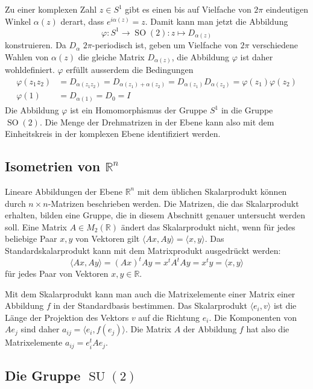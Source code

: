 Zu einer komplexen Zahl $z\in S^1$ gibt es einen bis auf Vielfache
von $2\pi$ eindeutigen Winkel $\alpha(z)$ derart, dass $e^{i\alpha(z)}=z$.
Damit kann man jetzt die Abbildung
\[
\varphi
\colon
S^1\to \operatorname{SO}(2)
:
z\mapsto  D_{\alpha(z)}
\]
konstruieren.
Da $D_{\alpha}$ $2\pi$-periodisch ist, geben um Vielfache
von $2\pi$ verschiedene Wahlen von $\alpha(z)$ die gleiche
Matrix $D_{\alpha(z)}$, die Abbildung $\varphi$ ist daher
wohldefiniert.
$\varphi$ erfüllt ausserdem die Bedingungen
\begin{align*}
\varphi(z_1z_2)
&=
D_{\alpha(z_1z_2)}
=
D_{\alpha(z_1)+\alpha(z_2)}
=
D_{\alpha(z_1)}D_{\alpha(z_2)}
=
\varphi(z_1)\varphi(z_2)
\\
\varphi(1)
&=
D_{\alpha(1)}
=
D_0
=
I
\end{align*}
Die Abbildung $\varphi$ ist ein Homomorphismus der Gruppe $S^1$
in die Gruppe $\operatorname{SO}(2)$.
Die Menge der Drehmatrizen in der Ebene kann also mit dem Einheitskreis
in der komplexen Ebene identifiziert werden.

\subsection{Isometrien von $\mathbb{R}^n$
\label{buch:gruppen:isometrien}}
Lineare Abbildungen der Ebene $\mathbb{R}^n$ mit dem üblichen Skalarprodukt
können durch $n\times n$-Matrizen beschrieben werden.
Die Matrizen, die das Skalarprodukt erhalten, bilden eine Gruppe,
die in diesem Abschnitt genauer untersucht werden soll.
Eine Matrix $A\in M_{2}(\mathbb{R})$ ändert das Skalarprodukt nicht, wenn
für jedes beliebige Paar $x,y$ von Vektoren gilt
$\langle Ax,Ay\rangle = \langle x,y\rangle$.
Das Standardskalarprodukt kann mit dem Matrixprodukt ausgedrückt werden:
\[
\langle Ax,Ay\rangle
=
(Ax)^tAy
=
x^tA^tAy
=
x^ty
=
\langle x,y\rangle
\]
für jedes Paar von Vektoren $x,y\in\mathbb{R}$.

Mit dem Skalarprodukt kann man auch die Matrixelemente einer Matrix
einer Abbildung $f$ in der Standardbasis bestimmen.
Das Skalarprodukt $\langle e_i, v\rangle$ ist die Länge der Projektion
des Vektors $v$ auf die Richtung $e_i$.
Die Komponenten von $Ae_j$ sind daher $a_{ij}=\langle e_i,f(e_j)\rangle$.
Die Matrix $A$ der Abbildung $f$ hat also die Matrixelemente
$a_{ij}=e_i^tAe_j$.


\subsection{Die Gruppe $\operatorname{SU}(2)$
\label{buch:gruppen:su2}}
